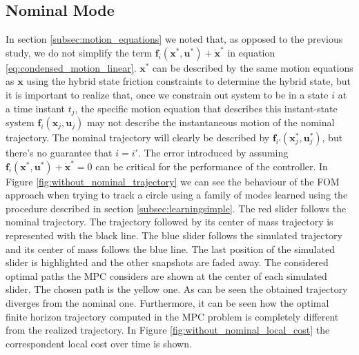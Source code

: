 \documentclass[12,twoside]{TFG-GM}
\theoremstyle{definition}
\theoremstyle{remark}
\begin{document}
\subsection{Nominal Mode}
\label{subsec:nominal_mode}
In section \ref{subsec:motion_equations} we noted that, as opposed to the previous study, we do not simplify the term $\textbf{f}_i(\textbf{x}^*, \textbf{u}^*) + \dot{\textbf{x}}^*$ in equation \ref{eq:condensed_motion_linear}. $\textbf{x}^*$ can be described by the same motion equations as $\textbf{x}$ using the hybrid state friction constraints to determine the hybrid state, but it is important to realize that, once we constrain out system to be in a state $i$ at a time instant $t_j$, the specific motion equation that describes this instant-state system $\textbf{f}_i(\textbf{x}_j, \textbf{u}_j)$ may not describe the instantaneous motion of the nominal trajectory. The nominal trajectory will clearly be described by $\textbf{f}_{i'}(\textbf{x}_j^*, \textbf{u}_j^*)$, but there's no guarantee that $i = i'$. The error introduced by assuming $\textbf{f}_i(\textbf{x}^*, \textbf{u}^*) + \dot{\textbf{x}}^* = 0$ can be critical for the performance of the controller. In Figure \ref{fig:without_nominal_trajectory} we can see the behaviour of the FOM approach when trying to track a circle using a family of modes learned using the procedure described in section \ref{subsec:learningsimple}. The red slider follows the nominal trajectory. The trajectory followed by its center of mass trajectory is represented with the black line. The blue slider follows the simulated trajectory and its center of mass follows the blue line. The last position of the simulated slider is highlighted and the other snapshots are faded away. The considered optimal paths the MPC considers are shown at the center of each simulated slider. The chosen path is the yellow one. As can be seen the obtained trajectory diverges from the nominal one. Furthermore, it can be seen how the optimal finite horizon trajectory computed in the MPC problem is completely different from the realized trajectory. In Figure \ref{fig:without_nominal_local_cost} the correspondent local cost over time is shown.
\end{document}
